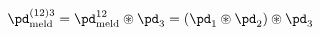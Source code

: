 \begin{equation}
  \pd_{\text{meld}}^{(12)3} = 
  \pd_{\text{meld}}^{12} \circledast \pd_{3} = 
  (\pd_{1} \circledast \pd_{2}) \circledast \pd_{3}
  \label{eqn:iterated-application-melding}
\end{equation}